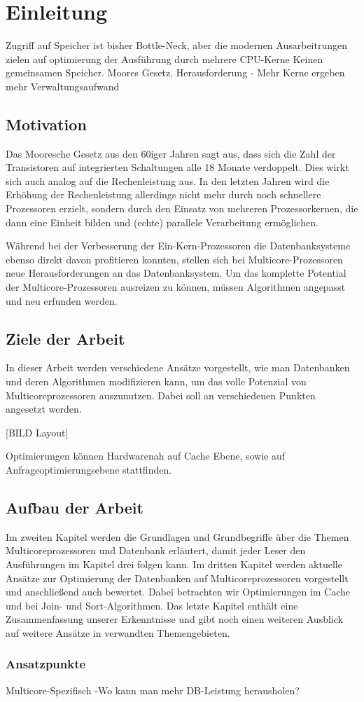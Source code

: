 \chapter{Einleitung}
\label{sec:Einleitung}
Zugriff auf Speicher ist bisher Bottle-Neck, aber die modernen Ausarbeitrungen zielen auf optimierung der Ausführung durch mehrere CPU-Kerne
Keinen gemeinsamen Speicher.
Moores Gesetz.
Herausforderung - Mehr Kerne ergeben mehr Verwaltungsaufwand

\section{Motivation}
\label{sec:Motivation}
Das Mooresche Gesetz aus den 60iger Jahren sagt aus, dass sich die Zahl der Transistoren auf integrierten Schaltungen alle 18 Monate verdoppelt. Dies wirkt sich auch analog auf die Rechenleistung aus. In den letzten Jahren wird die Erhöhung der Rechenleistung allerdings nicht mehr durch noch schnellere Prozessoren erzielt, sondern durch den Einsatz von mehreren Prozessorkernen, die dann eine Einheit bilden und (echte) parallele Verarbeitung ermöglichen.

Während bei der Verbesserung der Ein-Kern-Prozessoren die Datenbanksysteme ebenso direkt davon profitieren konnten, stellen sich bei Multicore-Prozessoren neue Herausforderungen an das Datenbanksystem. Um das komplette Potential der Multicore-Prozessoren ausreizen zu können, müssen Algorithmen angepasst und neu erfunden werden.

\section{Ziele der Arbeit}
\label{sec:ZieleDerArbeit}
In dieser Arbeit werden verschiedene Ansätze vorgestellt, wie man Datenbanken und deren Algorithmen modifizieren kann, um das volle Potenzial von Multicoreprozessoren auszunutzen. Dabei soll an verschiedenen Punkten angesetzt werden. 

[BILD Layout]

Optimierungen können Hardwarenah auf Cache Ebene, sowie auf Anfrageoptimierungsebene stattfinden.

\section{Aufbau der Arbeit}
\label{sec:AufbauDerArbeit}
Im zweiten Kapitel werden die Grundlagen und Grundbegriffe über die Themen Multicoreprozessoren und Datenbank erläutert, damit jeder Leser den Ausführungen im Kapitel drei folgen kann. Im dritten Kapitel werden aktuelle Ansätze zur Optimierung der Datenbanken auf Multicoreprozessoren vorgestellt und anschließend auch bewertet. Dabei betrachten wir Optimierungen im Cache und bei Join- und Sort-Algorithmen. Das letzte Kapitel enthält eine Zusammenfassung unserer Erkenntnisse und gibt noch einen weiteren Ausblick auf weitere Ansätze in verwandten Themengebieten.


\subsection*{Ansatzpunkte}
\label{sec:Ansatzpunkte}
Multicore-Spezifisch -Wo kann man mehr DB-Leistung herausholen? 
